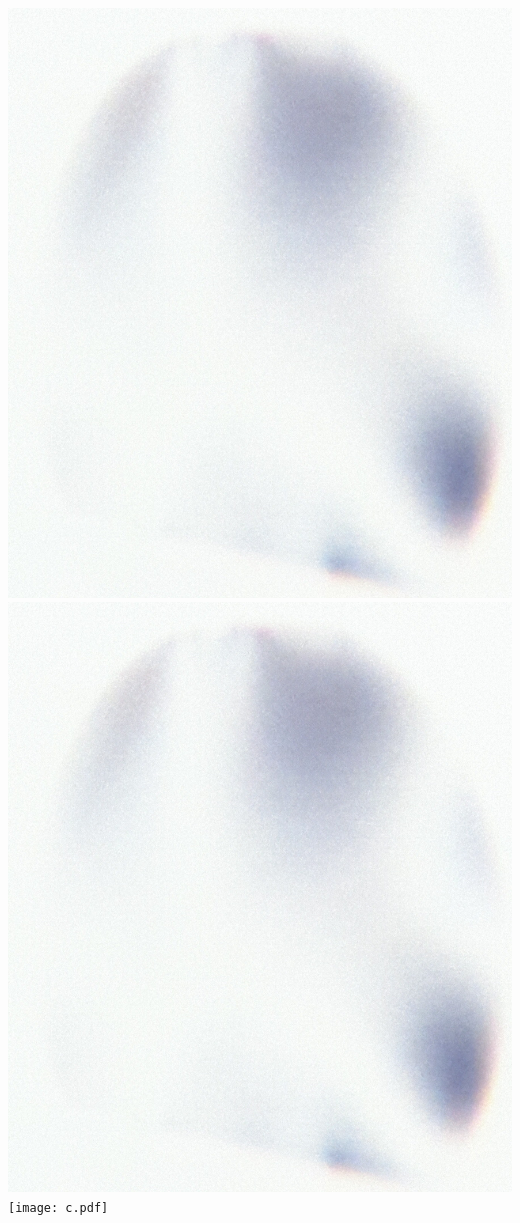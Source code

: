 \includegraphics[height=0.3\textheight]{Filter.jpg}
\hfill
\includegraphics[height=0.3\textheight]{Filter.jpg}
\texttt{[image: c.pdf]}

